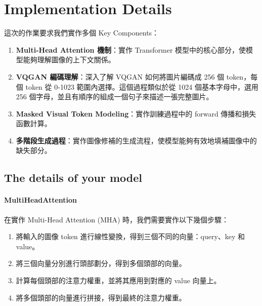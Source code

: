 \section{Implementation Details}

這次的作業要求我們實作多個 Key Components：

\begin{enumerate}
    \item \textbf{Multi-Head Attention 機制}：實作 Transformer 模型中的核心部分，使模型能夠理解圖像的上下文關係。
    
    \item \textbf{VQGAN 編碼理解}：深入了解 VQGAN 如何將圖片編碼成 256 個 token，每個 token 從 0-1023 範圍內選擇。這個過程類似於從 1024 個基本字母中，選用 256 個字母，並且有順序的組成一個句子來描述一張完整圖片。
    
    \item \textbf{Masked Visual Token Modeling}：實作訓練過程中的 forward 傳播和損失函數計算。
    
    \item \textbf{多階段生成過程}：實作圖像修補的生成流程，使模型能夠有效地填補圖像中的缺失部分。
\end{enumerate}



\subsection{The details of your model}

\paragraph{MultiHeadAttention} 在實作 Multi-Head Attention (MHA) 時，我們需要實作以下幾個步驟：

\begin{enumerate}
    \item 將輸入的圖像 token 進行線性變換，得到三個不同的向量：query、key 和 value。
    \item 將三個向量分別進行頭部劃分，得到多個頭部的向量。
    \item 計算每個頭部的注意力權重，並將其應用到對應的 value 向量上。
    \item 將多個頭部的向量進行拼接，得到最終的注意力權重。 
\end{enumerate}




